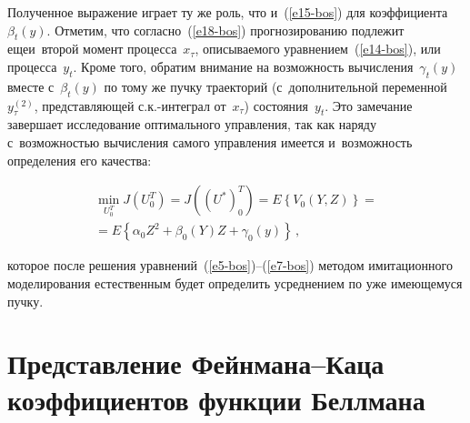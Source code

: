 \begin{multicols}{2}
     Полученное выражение играет ту же роль, что и~(\ref{e15-bos}) для 
коэффициента~$\beta_t(y)$. Отметим, что согласно~(\ref{e18-bos}) 
прогнозированию подлежит еще\linebreak и~второй момент процесса~$x_\tau$, 
описываемого уравнением~(\ref{e14-bos}), или процесса~$y_t$. Кроме того, 
обратим внимание на возможность вычисления~$\gamma_t(y)$ вмес\-те 
с~$\beta_t(y)$ по тому же пучку траекторий (с~дополнительной 
переменной~$y_\tau^{(2)}$, пред\-став\-ля\-ющей с.к.-ин\-те\-грал 
от~$x_\tau$) состояния~$y_t$. Это замечание завершает исследование 
оптимального управления, так как наряду с~возможностью вычисления 
самого управления имеется и~возможность определения его качества:

\vspace*{-2pt}

\noindent
     \begin{multline*}
     \min\limits_{U_0^T} J\left( U_0^T\right) =J\left( \left( 
U^*\right)_0^T\right) = E\left\{ V_0\left( Y,Z\right)\right\}={}\\
{}=
     E\left\{ \alpha_0Z^2+\beta_0(Y)Z+\gamma_0(y)\right\}\,,
     \end{multline*}
     
     \vspace*{-2pt}
     
     \noindent
которое после решения уравнений~(\ref{e5-bos})--(\ref{e7-bos}) методом 
имитационного моделирования естественным будет определить усреднением 
по уже имеющемуся пучку.

\vspace*{-6pt}

\section{Представление Фейнмана--Каца коэффициентов функции 
Беллмана}

\vspace*{-3pt}


\end{multicols}
